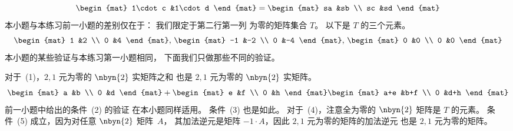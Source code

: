 \begin{exercises}
\begin{answer}
\begin{exparts}
\begin{equation*}
\begin{mat}
              1\cdot c  &1\cdot d
            \end{mat}
            =
            \begin{mat}
              sa  &sb  \\
              sc  &sd
            \end{mat}
          \end{equation*}
        \partsitem
          本小题与本练习前一小题的差别仅在于：
          我们限定于第二行第一列
          为零的矩阵集合 $T$。
          以下是 $T$ 的三个元素。
          \begin{equation*}
            \begin{mat}
              1  &2  \\
              0  &4
            \end{mat},\,
            \begin{mat}
              -1  &-2  \\
              0  &-4
            \end{mat},\,
            \begin{mat}
              0  &0  \\
              0  &0
            \end{mat}
          \end{equation*}
          本小题的某些验证与本练习第一小题相同，
          下面我们只做那些不同的验证。

          对于~(1)，$2,1$ 元为零的 $\nbyn{2}$ 实矩阵之和
          也是 $2,1$ 元为零的 $\nbyn{2}$ 实矩阵。
          \begin{equation*}
            \begin{mat}
              a  &b  \\
              0  &d
            \end{mat}
            +
            \begin{mat}
              e  &f  \\
              0  &h
            \end{mat}
            \begin{mat}
              a+e  &b+f  \\
              0    &d+h
            \end{mat}
          \end{equation*}
          前一小题中给出的条件~(2) 的验证
          在本小题同样适用。
          条件~(3) 也是如此。
          对于~(4)，注意全为零的 $\nbyn{2}$
          矩阵是 $T$ 的元素。
          条件~(5) 成立，因为对任意 $\nbyn{2}$ 矩阵~$A$，
          其加法逆元是矩阵
          $-1\cdot A$，因此 $2,1$ 元为零的矩阵的加法逆元
          也是 $2,1$ 元为零的矩阵。


\end{exparts}
\end{answer}
\end{exercises}
